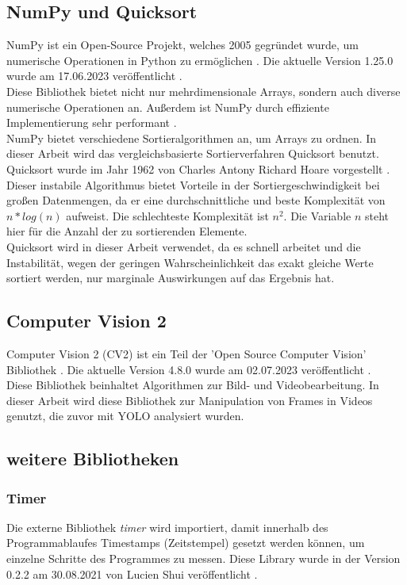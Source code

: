 		\subsection{NumPy und Quicksort}
		{ \label{subsec:NumPy}
		NumPy ist ein Open-Source Projekt, welches 2005 gegründet wurde, um numerische Operationen in Python zu ermöglichen \citep{numpy_about}. Die aktuelle Version 1.25.0 wurde am 17.06.2023 veröffentlicht \citep{numpy_main_web}. \\
		Diese Bibliothek bietet nicht nur mehrdimensionale Arrays, sondern auch diverse numerische Operationen an. Außerdem ist NumPy durch effiziente Implementierung sehr performant \citep{numpy_main_web}. \\

		NumPy bietet verschiedene Sortieralgorithmen an, um Arrays zu ordnen. In dieser Arbeit wird das vergleichsbasierte Sortierverfahren \glqq Quicksort\grqq{} benutzt. \\
		Quicksort wurde im Jahr 1962 von Charles Antony Richard Hoare vorgestellt \citep{Hoare1962QS}. Dieser instabile Algorithmus bietet Vorteile in der Sortiergeschwindigkeit bei großen Datenmengen, da er eine durchschnittliche und beste Komplexität von $n*log(n)$ aufweist. Die schlechteste Komplexität ist $n^2$. Die Variable $n$ steht hier für die Anzahl der zu sortierenden Elemente. \\
		Quicksort wird in dieser Arbeit verwendet, da es schnell arbeitet und die Instabilität, wegen der geringen Wahrscheinlichkeit das exakt gleiche Werte sortiert werden, nur marginale Auswirkungen auf das Ergebnis hat.
		}

		\subsection{Computer Vision 2}
		{ \label{subsec:Computer_Vision_2}
		Computer Vision 2 (CV2) ist ein Teil der 'Open Source Computer Vision' Bibliothek \citep{opencv_about}. Die aktuelle Version 4.8.0 wurde am 02.07.2023 veröffentlicht \citep{opencv_release}. \\
		Diese Bibliothek beinhaltet Algorithmen zur Bild- und Videobearbeitung. In dieser Arbeit wird diese Bibliothek zur Manipulation von Frames in Videos genutzt, die zuvor mit YOLO analysiert wurden. 
		}
		\subsection{weitere Bibliotheken}
		\subsubsection*{Timer}	
		{Die externe Bibliothek \textit{timer} wird importiert, damit innerhalb des Programmablaufes Timestamps (Zeitstempel) gesetzt werden können, um einzelne Schritte des Programmes zu messen. Diese Library wurde in der Version 0.2.2 am 30.08.2021 von Lucien Shui veröffentlicht \citep{Shui2021}. }
